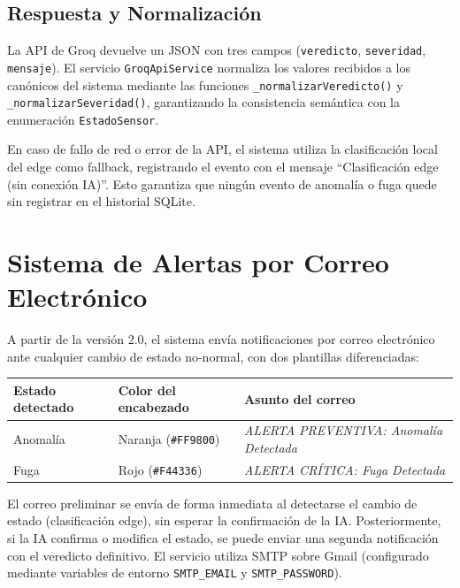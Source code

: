 \documentclass[12pt,a4paper]{article}
\begin{document}
\subsection{Respuesta y Normalización}

La API de Groq devuelve un JSON con tres campos (\texttt{veredicto}, \texttt{severidad}, \texttt{mensaje}). El servicio \texttt{GroqApiService} normaliza los valores recibidos a los canónicos del sistema mediante las funciones \texttt{\_normalizarVeredicto()} y \texttt{\_normalizarSeveridad()}, garantizando la consistencia semántica con la enumeración \texttt{EstadoSensor}.

En caso de fallo de red o error de la API, el sistema utiliza la clasificación local del edge como fallback, registrando el evento con el mensaje ``Clasificación edge (sin conexión IA)''. Esto garantiza que ningún evento de anomalía o fuga quede sin registrar en el historial SQLite.

\section{Sistema de Alertas por Correo Electrónico}

A partir de la versión 2.0, el sistema envía notificaciones por correo electrónico ante cualquier cambio de estado no-normal, con dos plantillas diferenciadas:

\begin{center}
\begin{tabularx}{0.9\textwidth}{lXX}
    \toprule
    \textbf{Estado detectado} & \textbf{Color del encabezado} & \textbf{Asunto del correo} \\
    \midrule
    Anomalía & Naranja (\texttt{\#FF9800}) & \textit{ALERTA PREVENTIVA: Anomalía Detectada} \\
    Fuga     & Rojo (\texttt{\#F44336})    & \textit{ALERTA CRÍTICA: Fuga Detectada} \\
    \bottomrule
\end{tabularx}
\end{center}

El correo preliminar se envía de forma inmediata al detectarse el cambio de estado (clasificación edge), sin esperar la confirmación de la IA. Posteriormente, si la IA confirma o modifica el estado, se puede enviar una segunda notificación con el veredicto definitivo. El servicio utiliza SMTP sobre Gmail (configurado mediante variables de entorno \texttt{SMTP\_EMAIL} y \texttt{SMTP\_PASSWORD}).
\end{document}
